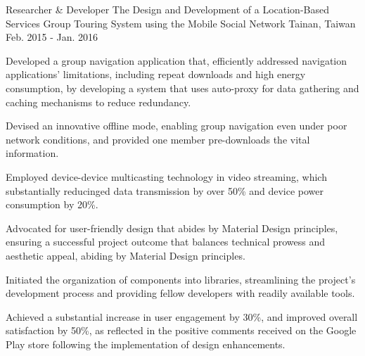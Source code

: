 

\begin{cventries}

  \cventry
    {Researcher \& Developer} %
    {The Design and Development of a Location-Based Services Group Touring System using the Mobile Social Network} %
    {Tainan, Taiwan} %
    {Feb. 2015 - Jan. 2016} %
    {
      \begin{cvitems} %
        \item {Developed a group navigation application that, efficiently addressed navigation applications' limitations, including repeat downloads and high energy consumption, by developing a system that uses auto-proxy for data gathering and caching mechanisms to reduce redundancy.}
        \item {Devised an innovative offline mode, enabling group navigation even under poor network conditions, and provided one member pre-downloads the vital information.}
        \item {Employed device-device multicasting technology in video streaming, which substantially reducinged data transmission by over 50\% and device power consumption by 20\%.}
        \item {Advocated for user-friendly design that abides by Material Design principles, ensuring a successful project outcome that balances technical prowess and aesthetic appeal, abiding by Material Design principles.}
        \item {Initiated the organization of components into libraries, streamlining the project's development process and providing fellow developers with readily available tools.}
        \item {Achieved a substantial increase in user engagement by 30\%, and improved overall satisfaction by 50\%, as reflected in the positive comments received on the Google Play store following the implementation of design enhancements.}
      \end{cvitems}
    }

\end{cventries}
